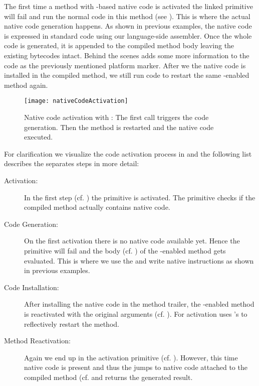 \noindent The first time a method with \B-based native code is activated the linked \B primitive will fail and run the normal \PH code in this method (see ).
This is where the actual native code generation happens.
As shown in previous examples, the native code is expressed in standard \PH code using our language-side assembler.
Once the whole code is generated, it is appended to the compiled method body leaving the existing \PH bytecodes intact.
Behind the scenes \B adds some more information to the code as the previously mentioned platform marker. 
After we the native code is installed in the compiled method, we still run \PH code to restart the same \B-enabled method again.
%
\begin{figure}[ht]
	\centering
	\texttt{[image: nativeCodeActivation]}
	\caption[\B Native Code Acivation]{Native code activation with \B: The first call triggers the code generation. Then the method is restarted and the native code executed.}
\end{figure}
%
For clarification we visualize the code activation process in  and the following list describes the separates steps in more detail:
%
\begin{description}
\item[Activation:] In the first step (cf. ) the \B primitive is activated.
	The primitive checks if the compiled method actually contains native code.
\item[Code Generation:] On the first activation there is no native code available yet.
	Hence the primitive will fail and the \PH body (cf. ) of the \B-enabled method gets evaluated.
	This is where we use the \B \API and write native instructions as shown in previous examples.
\item[Code Installation:] After installing the native code in the method trailer, the \B-enabled method is reactivated with the original arguments (cf. ).
	For activation \B uses \PH's   to reflectively restart the method.
\item[Method Reactivation:] Again we end up in the \B activation primitive (cf. ).
	However, this time native code is present and thus the \B jumps to native code attached to the compiled method (cf.  and returns the generated result.
\end{description}


